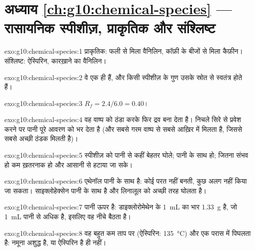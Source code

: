 \section*{अध्याय \ref{ch:g10:chemical-species} --- रासायनिक स्पीशीज़, प्राकृतिक और संश्लिष्ट}

\begin{solution}{exo:g10:chemical-species:1}
प्राकृतिक: फली से मिला वैनिलिन, कॉफ़ी के बीजों से मिला कैफ़ीन। संश्लिष्ट:
ऐस्पिरिन, कारख़ाने का वैनिलिन।
\end{solution}

\begin{solution}{exo:g10:chemical-species:2}
वे एक ही  हैं, और किसी स्पीशीज़ के गुण उसके स्रोत से
स्वतंत्र होते हैं।
\end{solution}

\begin{solution}{exo:g10:chemical-species:3}
$R_f = 2.4/6.0 = 0.40$।
\end{solution}

\begin{solution}{exo:g10:chemical-species:4}
वह वाष्प को ठंडा करके फिर द्रव बना देता है। निचले सिरे से प्रवेश करने पर पानी
पूरे आवरण को भर देता है (और सबसे गरम वाष्प से सबसे आख़िर में मिलता है, जिससे
सबसे अच्छी ठंडक मिलती है)।
\end{solution}

\begin{solution}{exo:g10:chemical-species:5}
स्पीशीज़ को पानी से कहीं बेहतर घोले; पानी के साथ  हो;
जितना संभव हो कम ख़तरनाक हो और आसानी से हटाया जा सके।
\end{solution}

\begin{solution}{exo:g10:chemical-species:6}
एथेनॉल पानी के साथ  है: कोई परत नहीं बनती, कुछ अलग नहीं किया जा सकता।
साइक्लोहेक्सेन पानी के साथ  है और लिनालूल को अच्छी तरह घोलता है।
\end{solution}

\begin{solution}{exo:g10:chemical-species:7}
पानी ऊपर है: डाइक्लोरोमेथेन के \qty{1}{mL} का भार \qty{1.33}{g} है,
जो \qty{1}{mL} पानी से अधिक है, इसलिए वह नीचे बैठता है।
\end{solution}

\begin{solution}{exo:g10:chemical-species:8}
वह बहुत कम ताप पर (ऐस्पिरिन: \qty{135}{\celsius}) और एक परास में पिघलता है:
नमूना अशुद्ध है, या ऐस्पिरिन है ही नहीं।
\end{solution}


